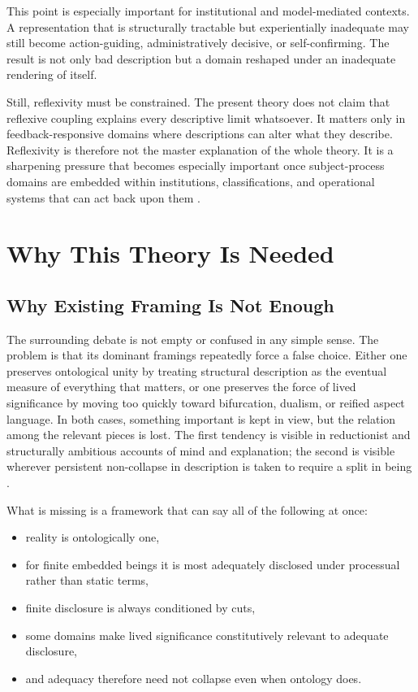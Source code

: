 \documentclass[11pt]{article}
\begin{document}
This point is especially important for institutional and model-mediated contexts. A representation that is structurally tractable but experientially inadequate may still become action-guiding, administratively decisive, or self-confirming. The result is not only bad description but a domain reshaped under an inadequate rendering of itself.

Still, reflexivity must be constrained. The present theory does not claim that reflexive coupling explains every descriptive limit whatsoever. It matters only in feedback-responsive domains where descriptions can alter what they describe. Reflexivity is therefore not the master explanation of the whole theory. It is a sharpening pressure that becomes especially important once subject-process domains are embedded within institutions, classifications, and operational systems that can act back upon them \cite{Bateson1972,Pask1975,Hacking1995}.
\section{Why This Theory Is Needed}

\subsection{Why Existing Framing Is Not Enough}

The surrounding debate is not empty or confused in any simple sense. The problem is that its dominant framings repeatedly force a false choice. Either one preserves ontological unity by treating structural description as the eventual measure of everything that matters, or one preserves the force of lived significance by moving too quickly toward bifurcation, dualism, or reified aspect language. In both cases, something important is kept in view, but the relation among the relevant pieces is lost. The first tendency is visible in reductionist and structurally ambitious accounts of mind and explanation; the second is visible wherever persistent non-collapse in description is taken to require a split in being \cite{Nagel1974,Levine1983,Chalmers1995}.

What is missing is a framework that can say all of the following at once:
\begin{itemize}
    \item reality is ontologically one,
    \item for finite embedded beings it is most adequately disclosed under processual rather than static terms,
    \item finite disclosure is always conditioned by cuts,
    \item some domains make lived significance constitutively relevant to adequate disclosure,
    \item and adequacy therefore need not collapse even when ontology does.
\end{itemize}
\end{document}
